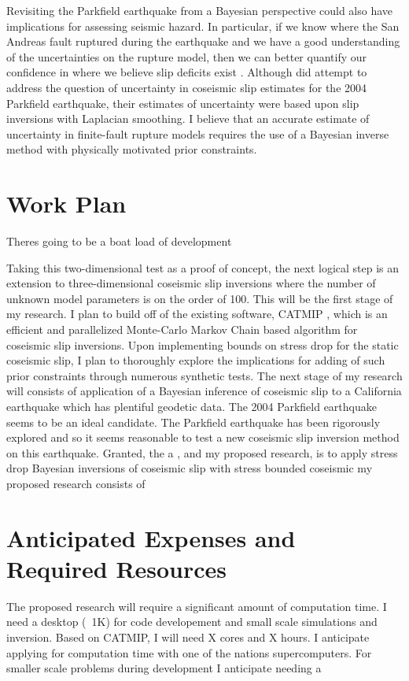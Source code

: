 \documentclass[12pt]{article}
\begin{document}
Revisiting the Parkfield earthquake from a Bayesian perspective could also have implications for assessing seismic hazard.  In particular, if we know where the San Andreas fault ruptured during the earthquake and we have a good understanding of the uncertainties on the rupture model, then we can better quantify our confidence in where we believe slip deficits exist \citep{Murray2006}.  Although \citet{Page2009} did attempt to address the question of uncertainty in coseismic slip estimates for the 2004 Parkfield earthquake, their estimates of uncertainty were based upon slip inversions with Laplacian smoothing.  I believe that an accurate estimate of uncertainty in finite-fault rupture models requires the use of a Bayesian inverse method with physically motivated prior constraints.

\section*{Work Plan}
Theres going to be a boat load of development

Taking this two-dimensional test as a proof of concept, the next logical step is an extension to three-dimensional coseismic slip inversions where the number of unknown model parameters is on the order of 100.  This will be the first stage of my research.  I plan to build off of the existing software, CATMIP \cite{Minson2013}, which is an efficient and parallelized Monte-Carlo Markov Chain based algorithm for coseismic slip inversions.  Upon implementing bounds on stress drop for the static coseismic slip, I plan to thoroughly explore the implications for adding of such prior constraints through numerous synthetic tests.  The next stage of my research will consists of application of a Bayesian inference of coseismic slip to a California earthquake which has plentiful geodetic data.  The 2004 Parkfield earthquake seems to be an ideal candidate.  The Parkfield earthquake has been rigorously explored and so it seems reasonable to test a new coseismic slip inversion method on this earthquake.  Granted, the   a , and my proposed research, is to apply stress drop  Bayesian inversions of coseismic slip with stress bounded coseismic my proposed research consists of  

\section*{Anticipated Expenses and Required Resources}
The proposed research will require a significant amount of computation time.  I need a desktop (~1K) for code developement and small scale simulations and inversion.  Based on CATMIP, I will need X cores and X hours. I anticipate applying for computation time with one of the nations supercomputers.  For smaller scale problems during development I anticipate needing a  
\end{document}
